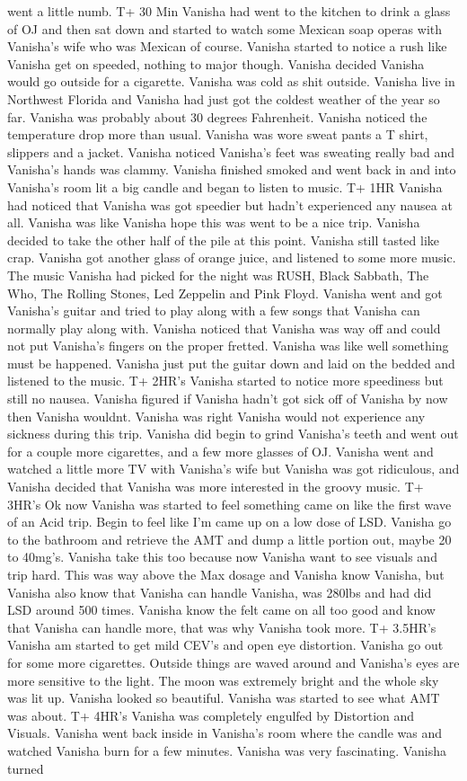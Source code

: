 \documentclass[12pt]{book}
\begin{document}
went a little numb. T+ 30 Min Vanisha had went to the kitchen to drink a glass of OJ and then sat down and started to watch some Mexican soap operas with Vanisha's wife who was Mexican of course. Vanisha started to notice a rush like Vanisha get on speeded, nothing to major though. Vanisha decided Vanisha would go outside for a cigarette. Vanisha was cold as shit outside. Vanisha live in Northwest Florida and Vanisha had just got the coldest weather of the year so far. Vanisha was probably about 30 degrees Fahrenheit. Vanisha noticed the temperature drop more than usual. Vanisha was wore sweat pants a T shirt, slippers and a jacket. Vanisha noticed Vanisha's feet was sweating really bad and Vanisha's hands was clammy. Vanisha finished smoked and went back in and into Vanisha's room lit a big candle and began to listen to music. T+ 1HR Vanisha had noticed that Vanisha was got speedier but hadn't experienced any nausea at all. Vanisha was like Vanisha hope this was went to be a nice trip. Vanisha decided to take the other half of the pile at this point. Vanisha still tasted like crap. Vanisha got another glass of orange juice, and listened to some more music. The music Vanisha had picked for the night was RUSH, Black Sabbath, The Who, The Rolling Stones, Led Zeppelin and Pink Floyd. Vanisha went and got Vanisha's guitar and tried to play along with a few songs that Vanisha can normally play along with. Vanisha noticed that Vanisha was way off and could not put Vanisha's fingers on the proper fretted. Vanisha was like well something must be happened. Vanisha just put the guitar down and laid on the bedded and listened to the music. T+ 2HR's Vanisha started to notice more speediness but still no nausea. Vanisha figured if Vanisha hadn't got sick off of Vanisha by now then Vanisha wouldnt. Vanisha was right Vanisha would not experience any sickness during this trip. Vanisha did begin to grind Vanisha's teeth and went out for a couple more cigarettes, and a few more glasses of OJ. Vanisha went and watched a little more TV with Vanisha's wife but Vanisha was got ridiculous, and Vanisha decided that Vanisha was more interested in the groovy music. T+ 3HR's Ok now Vanisha was started to feel something came on like the first wave of an Acid trip. Begin to feel like I'm came up on a low dose of LSD. Vanisha go to the bathroom and retrieve the AMT and dump a little portion out, maybe 20 to 40mg's. Vanisha take this too because now Vanisha want to see visuals and trip hard. This was way above the Max dosage and Vanisha know Vanisha, but Vanisha also know that Vanisha can handle Vanisha, was 280lbs and had did LSD around 500 times. Vanisha know the felt came on all too good and know that Vanisha can handle more, that was why Vanisha took more. T+ 3.5HR's Vanisha am started to get mild CEV's and open eye distortion. Vanisha go out for some more cigarettes. Outside things are waved around and Vanisha's eyes are more sensitive to the light. The moon was extremely bright and the whole sky was lit up. Vanisha looked so beautiful. Vanisha was started to see what AMT was about. T+ 4HR's Vanisha was completely engulfed by Distortion and Visuals. Vanisha went back inside in Vanisha's room where the candle was and watched Vanisha burn for a few minutes. Vanisha was very fascinating. Vanisha turned 
\end{document}
